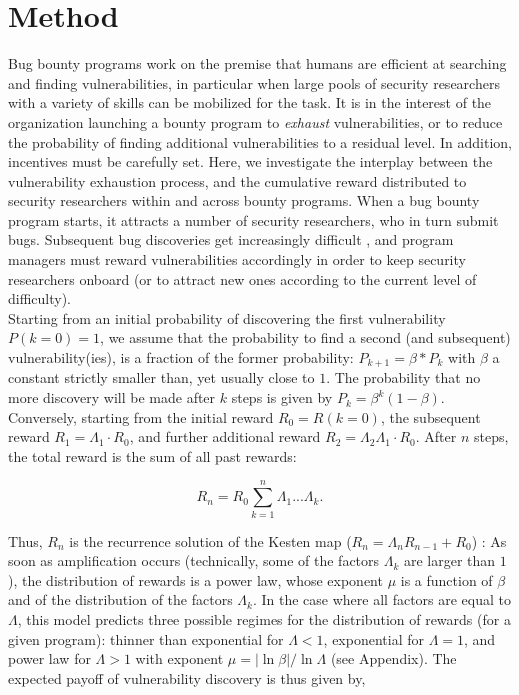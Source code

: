 \section{Method}
\label{sec:method}
Bug bounty programs work on the premise that humans are efficient at searching and finding vulnerabilities, in particular when large pools of security researchers with a variety of skills can be mobilized for the task. It is in the interest of the organization launching a bounty program to {\it exhaust} vulnerabilities, or to reduce the probability of finding additional vulnerabilities to a residual level. In addition, incentives must be carefully set. Here, we investigate the interplay between the vulnerability exhaustion process, and the cumulative reward distributed to security researchers within and across bounty programs. When a bug bounty program starts, it attracts a number of security researchers, who in turn submit bugs. Subsequent bug discoveries get increasingly difficult \cite{brady1999murphy}, and program managers must reward vulnerabilities accordingly in order to keep security researchers onboard (or to attract new ones according to the current level of difficulty). \\ %

Starting from an initial probability of discovering the first vulnerability $P(k=0) = 1$, we assume that the probability to find a second (and subsequent) vulnerability(ies), is a fraction of the former probability: $P_{k+1} = \beta * P_k$ with $\beta$ a constant strictly smaller than, yet usually close to $1$. 
The probability that no more discovery will be made after $k$ steps is given by $P_k = \beta^{k} (1-\beta)$. Conversely, starting from the initial reward $R_0 = R(k=0)$, the subsequent reward $R_1 = \Lambda_1 \cdot R_0$, and further additional reward $ R_2 = \Lambda_2 \Lambda_1 \cdot R_{0}$. After $n$ steps, the total reward is the sum of all past rewards: 

\begin{equation}
R_{n} = R_{0} \sum_{k=1}^{n} \Lambda_1 ... \Lambda_k.
\end{equation}

Thus, $R_{n}$ is the recurrence solution of the  
Kesten map ($R_{n} = \Lambda_n R_{n-1} +R_0$)
\cite{kesten1973random,sornette1997convergent}:  As soon as amplification occurs (technically, 
some of the factors $\Lambda_k$ are larger than $1$), the distribution
of rewards is a power law, whose exponent $\mu$ is a function of $\beta$
and of the distribution of the factors $\Lambda_k$. In the case where
all factors are equal to $\Lambda$, this model predicts three possible regimes for the distribution of rewards (for a given program): thinner than exponential for $\Lambda < 1$, exponential for $\Lambda = 1$, and power law for $\Lambda > 1$ with exponent $\mu = |\ln \beta|/ \ln \Lambda$ (see Appendix). The expected payoff of vulnerability discovery is thus given by,

